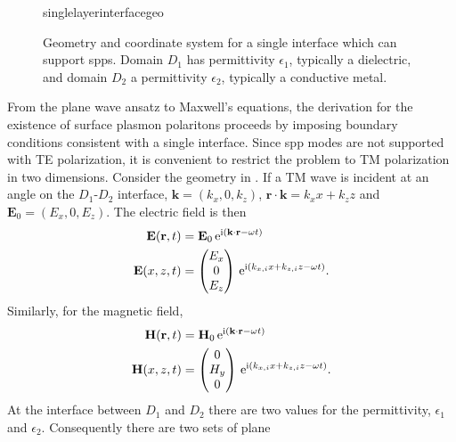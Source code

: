 \begin{figure}[ht]
  \centering
  {singlelayerinterfacegeo}
  \caption{Geometry and coordinate system for a single interface which can
    support \glspl{spp}.  Domain $D_1$ has permittivity $\epsilon_1$, typically a
    dielectric, and domain $D_2$ a permittivity $\epsilon_2$, typically a
    conductive metal.}
  \label{fig:singleinterfacegeo}
\end{figure}

From the plane wave ansatz to Maxwell's equations, the
derivation for the existence of surface plasmon polaritons proceeds
by imposing boundary conditions consistent with a single
interface.  Since \gls{spp} modes are not supported with TE polarization, it is
convenient to restrict the problem to TM polarization in two dimensions.
Consider the geometry in .  If
a TM wave is incident at an angle on the $D_1$-$D_2$ interface,
$\mathbf{k}=(k_x,0,k_z)$,
$\mathbf{r}\cdot\mathbf{k}=k_x x + k_z z$ and $\mathbf{E}_0 = (E_x, 0,
  E_z)$. The electric field is then
\begin{align}
  \mathbf{E} ( \mathbf{r}, t ) & = \mathbf{E}_0\, {\mathrm{e}}^{{\mathrm{i}} (\mathbf{k}
    \cdot \mathbf{r} - \omega t )}                                     \\
  \mathbf{E}(x,z,t)            & =\begin{pmatrix}
    E_x \\ 0\\ E_z
  \end{pmatrix}
  \, {\mathrm{e}}^{{\mathrm{i}}(k_{x,i}x+k_{z,i}z-\omega t)}.
  \label{eqn:planewavexz}
\end{align}
Similarly, for the magnetic field,
\begin{align}
  \mathbf{H} ( \mathbf{r}, t ) & = \mathbf{H}_0\, {\mathrm{e}}^{{\mathrm{i}} (\mathbf{k}
    \cdot \mathbf{r} - \omega t )}                                     \\
  \mathbf{H}(x,z,t)            & =\begin{pmatrix}
    0 \\ H_y\\ 0
  \end{pmatrix}
  \, {\mathrm{e}}^{{\mathrm{i}}(k_{x,i}x+k_{z,i}z-\omega t)}.
\end{align}
At the interface between $D_1$ and $D_2$ there are two values for the permittivity,
$\epsilon_1$ and $\epsilon_2$.  Consequently there are two sets of plane
